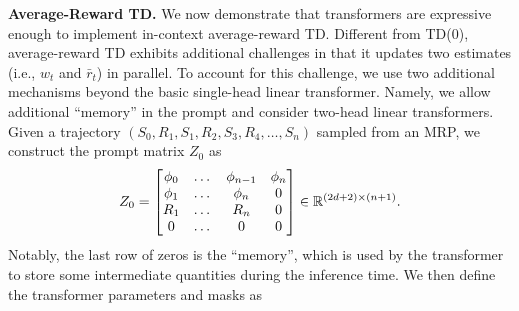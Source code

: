 \documentclass{article}
\newcommand{\R}{\mathbb{R}}
\newcommand{\tb}[1]{{\textbf{#1}}}
\begin{document}
\tb{Average-Reward TD.}
We now demonstrate that transformers are expressive enough to implement in-context average-reward TD.
Different from TD(0),
average-reward TD \citep{tsitsiklis1999average} exhibits additional challenges in that it updates two estimates (i.e., $w_t$ and $\bar r_t$) in parallel.
To account for this challenge,
we use two additional mechanisms beyond the basic single-head linear transformer.
Namely, 
we allow additional ``memory'' in the prompt and consider two-head linear transformers.
Given a trajectory $(S_0, R_1, S_1, R_2, S_3, R_4, \dots, S_n)$ sampled from an MRP,
we construct the prompt matrix $Z_0$ as
\begin{align}
    Z_0 = \mqty[\phi_0 & \dots & \phi_{n-1} & \phi_n \\ 
                \phi_1 & \dots & \phi_n & 0 \\ 
                R_1 & \dots & R_n & 0 \\ 
                0 & \dots & 0 & 0] \in \R^{(2d + 2) \times (n+1)}.
\end{align}
Notably, the last row of zeros is the ``memory'',
which is used by the transformer to store some intermediate quantities during the inference time.
We then define the transformer parameters and masks as
\end{document}
